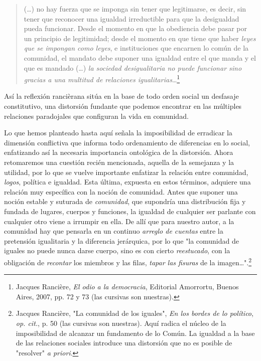 \documentclass{book}
\begin{document}
\begin{quote}
(\dots) no hay fuerza que se imponga sin tener que legitimarse, es
decir, sin tener que reconocer una igualdad irreductible para que la
desigualdad pueda funcionar. Desde el momento en que la obediencia debe
pasar por un principio de legitimidad; desde el momento en que tiene que
haber \emph{leyes que se impongan como leyes}, e instituciones que
encarnen lo común de la comunidad, el mandato debe suponer una igualdad
entre el que manda y el que es mandado (\dots) \emph{la sociedad
desigualitaria no puede funcionar sino gracias a una multitud de
relaciones igualitarias}\ldots{}\footnote{Jacques Rancière, \emph{El
  odio a la democracia}, Editorial Amorrortu, Buenos Aires, 2007, pp. 72
  y 73 (las cursivas son nuestras).}
\end{quote}

Así la reflexión rancièrana sitúa en la base de todo orden social un
desfasaje constitutivo, una distorsión fundante que podemos encontrar en
las múltiples relaciones paradojales que configuran la vida en
comunidad.

Lo que hemos planteado hasta aquí señala la imposibilidad de erradicar
la dimensión conflictiva que informa todo ordenamiento de diferencias en
lo social, enfatizando así la necesaria importancia ontológica de la
distorsión. Ahora retomaremos una cuestión recién mencionada, aquella de
la semejanza y la utilidad, por lo que se vuelve importante enfatizar la
relación entre comunidad, \emph{logos}, política e igualdad. Esta
última, expuesta en estos términos, adquiere una relación muy específica
con la noción de comunidad. Antes que suponer una noción estable y
suturada de \emph{comunidad}, que supondría una distribución fija y
fundada de lugares, cuerpos y funciones, la igualdad de cualquier ser
parlante con cualquier otro viene a irrumpir en ella. De allí que para
nuestro autor, a la comunidad hay que pensarla en un continuo
\emph{arreglo de cuentas} entre la pretensión igualitaria y la
diferencia jerárquica, por lo que "la comunidad de iguales no puede
nunca darse cuerpo, sino es con cierto \emph{reestucado}, con la
obligación de \emph{recontar} los miembros y las filas, \emph{tapar las
fisuras} de la imagen\ldots".\footnote{Jacques Rancière, "La comunidad
  de los iguales", \emph{En los bordes de lo político}, \emph{op. cit.},
  p. 50 (las cursivas son nuestras). Aquí radica el núcleo de la
  imposibilidad de alcanzar un fundamento de lo Común. La igualdad a la
  base de las relaciones sociales introduce una distorsión que no es
  posible de "resolver" \emph{a priori}.}
\end{document}
